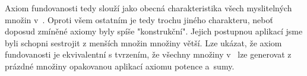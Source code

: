 Axiom fundovanosti tedy slouží jako obecná charakteristika všech myslitelných množin v~\ZF{}. Oproti všem ostatním je tedy trochu jiného charakteru, neboť doposud zmíněné axiomy byly spíše "konstrukční". Jejich postupnou aplikací jsme byli schopni sestrojit z menších množin množiny větší. Lze ukázat, že axiom fundovanosti je ekvivalentní s tvrzením, že všechny množiny v~\ZF{} lze generovat z prázdné množiny opakovanou aplikací axiomu potence a~sumy.
